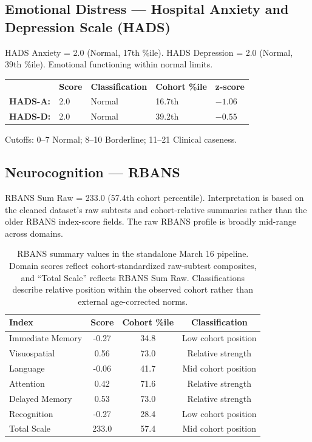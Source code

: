 \documentclass[11pt,a4paper]{article}
\begin{document}
\subsection{Emotional Distress --- Hospital Anxiety and Depression Scale (HADS)}
HADS Anxiety = 2.0 (Normal, 17th \%ile). HADS Depression = 2.0 (Normal, 39th \%ile). Emotional functioning within normal limits.

\noindent\begin{tabular}{lllll}
 & \textbf{Score} & \textbf{Classification} & \textbf{Cohort \%ile} & \textbf{z-score} \\
\textbf{HADS-A:} & 2.0 & Normal & 16.7th & $-1.06$ \\
\textbf{HADS-D:} & 2.0 & Normal & 39.2th & $-0.55$ \\
\end{tabular}

\smallskip\noindent\small Cutoffs: 0--7 Normal; 8--10 Borderline; 11--21 Clinical caseness.

\subsection{Neurocognition --- RBANS}
RBANS Sum Raw = 233.0 (57.4th cohort percentile). Interpretation is based on the cleaned dataset's raw subtests and cohort-relative summaries rather than the older RBANS index-score fields. The raw RBANS profile is broadly mid-range across domains. 

\begin{table}[H]
\centering\small
\begin{tabular}{lccc}
\toprule
\textbf{Index} & \textbf{Score} & \textbf{Cohort \%ile} & \textbf{Classification} \\
\midrule
    Immediate Memory & -0.27 & 34.8 & Low cohort position \\
    Visuospatial & 0.56 & 73.0 & Relative strength \\
    Language & -0.06 & 41.7 & Mid cohort position \\
    Attention & 0.42 & 71.6 & Relative strength \\
    Delayed Memory & 0.53 & 73.0 & Relative strength \\
    Recognition & -0.27 & 28.4 & Low cohort position \\
    Total Scale & 233.0 & 57.4 & Mid cohort position \\
\bottomrule
\end{tabular}
\caption{RBANS summary values in the standalone March 16 pipeline. Domain scores reflect cohort-standardized raw-subtest composites, and ``Total Scale'' reflects RBANS Sum Raw. Classifications describe relative position within the observed cohort rather than external age-corrected norms.}
\end{table}
\end{document}
